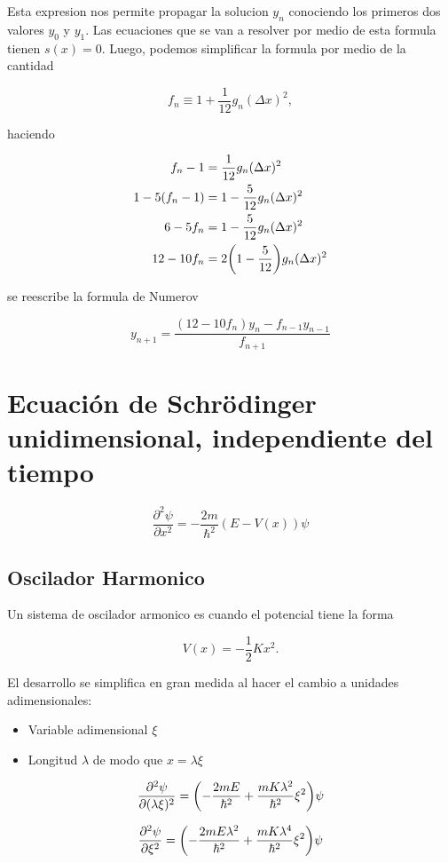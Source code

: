 \documentclass[11pt]{article}
\begin{document}
Esta expresion nos permite propagar la solucion \(y_n\) conociendo los primeros dos valores \(y_0\) y \(y_1\). Las ecuaciones que se van a resolver por medio de esta formula tienen \(s(x)=0\). Luego, podemos simplificar la formula por medio de la cantidad

\[ f_n \equiv 1 + \frac{1}{12}g_n(\Delta x)^2, \]

haciendo

\begin{align*}
    f_n - 1 &= \frac{1}{12}g_n(\Delta x)^2 \\
    1-5(f_n -1) &= 1-\frac{5}{12}g_n(\Delta x)^2 \\
    6-5f_n &= 1-\frac{5}{12}g_n(\Delta x)^2 \\
    12-10f_n &= 2\qty(1-\frac{5}{12})g_n(\Delta x)^2
\end{align*}

se reescribe la formula de Numerov

\[ y_{n+1} = \frac{(12-10f_n)y_n-f_{n-1}y_{n-1}}{f_{n+1}} \]
\section{Ecuación de Schrödinger unidimensional, independiente del tiempo}
\label{sec:org570b826}

\[ \frac{\partial^{2}\psi}{\partial x^2} = - \frac{2m}{\hbar^2}(E - V(x))\psi \]
\subsection{Oscilador Harmonico}
\label{sec:org334a6c8}

Un sistema de oscilador armonico es cuando el potencial tiene la forma

\[ V(x) = - \frac{1}{2}K x^2. \]

El desarrollo se simplifica en gran medida al hacer el cambio a unidades adimensionales:

\begin{itemize}
\item Variable adimensional \(\xi\)
\item Longitud \(\lambda\) de modo que \(x = \lambda \xi\)
\end{itemize}

\[ \pdv[2]{\psi}{(\lambda \xi)} = \qty( - \frac{2m E }{\hbar^2} + \frac{mK \lambda^2}{\hbar^2} \xi^2  )\psi \]

\[ \pdv[2]{\psi}{\xi} = \qty( - \frac{2m E \lambda^{2}}{\hbar^2} + \frac{mK \lambda^4}{\hbar^2} \xi^2  )\psi \]
\end{document}
